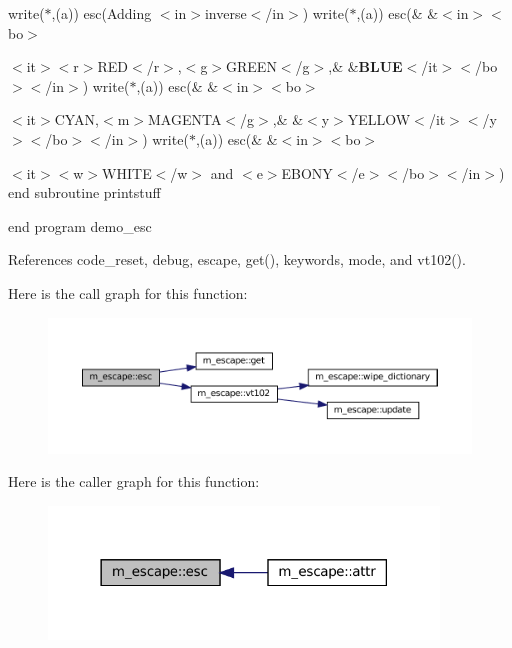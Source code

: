 write($\ast$,\textquotesingle{}(a)\textquotesingle{}) esc(\textquotesingle{}Adding $<$in$>$inverse$<$/in$>$\textquotesingle{}) write($\ast$,\textquotesingle{}(a)\textquotesingle{}) esc(\& \&\textquotesingle{}$<$in$>$$<$bo$>$
\begin{DoxyItemize}
\item 
\end{DoxyItemize}$<$it$>$$<$r$>$R\+ED$<$/r$>$,$<$g$>$G\+R\+E\+EN$<$/g$>$,\& \&{\bfseries B\+L\+UE}$<$/it$>$$<$/bo$>$$<$/in$>$\textquotesingle{}) write($\ast$,\textquotesingle{}(a)\textquotesingle{}) esc(\& \&\textquotesingle{}$<$in$>$$<$bo$>$
\begin{DoxyItemize}
\item 
\end{DoxyItemize}$<$it$>${\ttfamily C\+Y\+AN},$<$m$>$M\+A\+G\+E\+N\+TA$<$/g$>$,\& \&$<$y$>$Y\+E\+L\+L\+OW$<$/it$>$$<$/y$>$$<$/bo$>$$<$/in$>$\textquotesingle{}) write($\ast$,\textquotesingle{}(a)\textquotesingle{}) esc(\& \&\textquotesingle{}$<$in$>$$<$bo$>$
\begin{DoxyItemize}
\item 
\end{DoxyItemize}$<$it$>$$<$w$>$W\+H\+I\+TE$<$/w$>$ and $<$e$>$E\+B\+O\+NY$<$/e$>$$<$/bo$>$$<$/in$>$\textquotesingle{}) end subroutine printstuff

end program demo\+\_\+esc 

References code\+\_\+reset, debug, escape, get(), keywords, mode, and vt102().

Here is the call graph for this function\+:\nopagebreak
\begin{figure}[H]
\begin{center}
\leavevmode
\includegraphics[width=350pt]{namespacem__escape_a36f016baad6b23f86189e6f3ee6db0cb_cgraph}
\end{center}
\end{figure}
Here is the caller graph for this function\+:\nopagebreak
\begin{figure}[H]
\begin{center}
\leavevmode
\includegraphics[width=294pt]{namespacem__escape_a36f016baad6b23f86189e6f3ee6db0cb_icgraph}
\end{center}
\end{figure}
\mbox{\label{namespacem__escape_a4210456d81d9a1bf328093a9635e640b}} 

